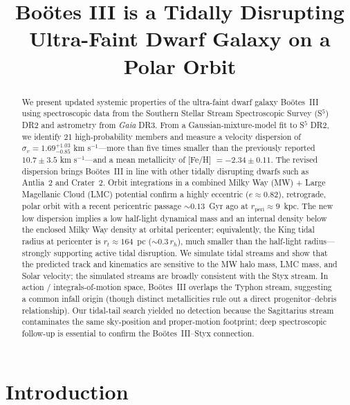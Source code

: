 \documentclass[twocolumn]{aastex631}
\newcommand{\gaia}{\textit{Gaia}\xspace}
\begin{document}
\title{Boötes III is a Tidally Disrupting Ultra-Faint Dwarf Galaxy on a Polar Orbit}



\begin{abstract}
We present updated systemic properties of the ultra-faint dwarf galaxy Boötes~III using spectroscopic data from the Southern Stellar Stream Spectroscopic Survey (S$^5$) DR2 and astrometry from \gaia DR3.
From a Gaussian-mixture-model fit to S$^5$ DR2, we identify 21 high-probability members and measure a velocity dispersion of $\sigma_{v} = 1.69^{+1.03}_{-0.85}$ km s$^{-1}$---more than five times smaller than the previously reported $10.7 \pm 3.5$ km s$^{-1}$---and a mean metallicity of [Fe/H] $= -2.34 \pm 0.11$. The revised dispersion brings Boötes~III in line with other tidally disrupting dwarfs such as Antlia~2 and Crater~2.
Orbit integrations in a combined Milky Way (MW) + Large Magellanic Cloud (LMC) potential confirm a highly eccentric ($e \approx 0.82$), retrograde, polar orbit with a recent pericentric passage $\sim 0.13$~Gyr ago at $r_{\mathrm{peri}} \approx 9$~kpc. The new low dispersion implies a low half-light dynamical mass and an internal density below the enclosed Milky Way density at orbital pericenter; equivalently, the King tidal radius at pericenter is $r_t \approx 164$~pc ($\sim 0.3\,r_h$), much smaller than the half-light radius---strongly supporting active tidal disruption.
We simulate tidal streams and show that the predicted track and kinematics are sensitive to the MW halo mass, LMC mass, and Solar velocity; the simulated streams are broadly consistent with the Styx stream.
In action / integrals-of-motion space, Boötes~III overlaps the Typhon stream, suggesting a common infall origin (though distinct metallicities rule out a direct progenitor--debris relationship).
Our tidal-tail search yielded no detection because the Sagittarius stream contaminates the same sky-position and proper-motion footprint; deep spectroscopic follow-up is essential to confirm the Boötes~III--Styx connection.
\end{abstract}


\section{Introduction} \label{section:intro}
\end{document}
